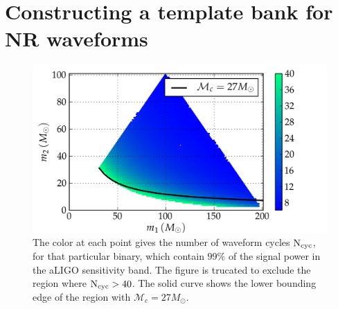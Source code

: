% 

%



\section{Constructing a template bank for NR waveforms}\label{s1:NRonlybank}

\begin{figure}
\centering
\includegraphics[width=1.1\columnwidth]{figures/nrhybbank/BBHm1m2_tlen_Ncyc40_0-99_Mchirp27_cropped-tiny.png}%
\caption{The color at each point gives the number 
of waveform cycles $\mathrm{N}_{\mathrm{cyc}}$, for that particular binary, which contain 
$99\%$ of the signal power in the aLIGO sensitivity band. The figure is 
trucated to exclude the region where $\mathrm{N}_{\mathrm{cyc}}>40$. The solid curve shows
the lower bounding edge of the region with $\mathcal{M}_c = 27M_\odot$.}
\label{fig:BBHregion}
\end{figure}

